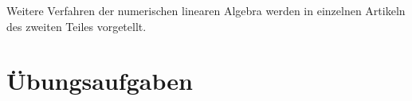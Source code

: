 Weitere Verfahren der numerischen linearen Algebra werden in einzelnen
Artikeln des zweiten Teiles vorgetellt.






\section*{Übungsaufgaben}
\begin{uebungsaufgaben}
\end{uebungsaufgaben}




